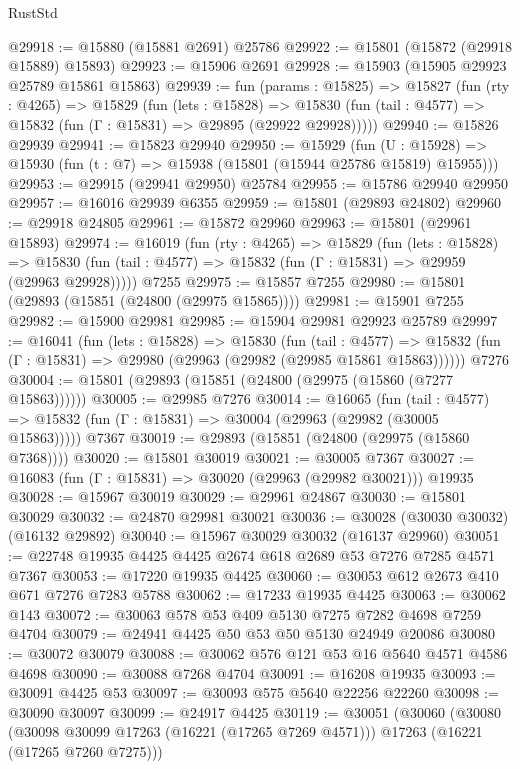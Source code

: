 \begin{lexlean}{RustStd}
\begin{coremodule}
@29918 := @15880 (@15881 @2691) @25786
@29922 := @15801 (@15872 (@29918 @15889) @15893)
@29923 := @15906 @2691
@29928 := @15903 (@15905 @29923 @25789 @15861 @15863)
@29939 := fun (params : @15825) =>
  @15827
    (fun (rty : @4265) =>
    @15829
      (fun (lets : @15828) =>
      @15830 (fun (tail : @4577) => @15832 (fun (Γ : @15831) => @29895 (@29922 @29928)))))
@29940 := @15826 @29939
@29941 := @15823 @29940
@29950 := @15929
    (fun (U : @15928) => @15930 (fun (t : @7) => @15938 (@15801 (@15944 @25786 @15819) @15955)))
@29953 := @29915 (@29941 @29950) @25784
@29955 := @15786 @29940 @29950
@29957 := @16016 @29939 @6355
@29959 := @15801 (@29893 @24802)
@29960 := @29918 @24805
@29961 := @15872 @29960
@29963 := @15801 (@29961 @15893)
@29974 := @16019
    (fun (rty : @4265) =>
    @15829
      (fun (lets : @15828) =>
      @15830 (fun (tail : @4577) => @15832 (fun (Γ : @15831) => @29959 (@29963 @29928)))))
    @7255
@29975 := @15857 @7255
@29980 := @15801 (@29893 (@15851 (@24800 (@29975 @15865))))
@29981 := @15901 @7255
@29982 := @15900 @29981
@29985 := @15904 @29981 @29923 @25789
@29997 := @16041
    (fun (lets : @15828) =>
    @15830
      (fun (tail : @4577) =>
      @15832 (fun (Γ : @15831) => @29980 (@29963 (@29982 (@29985 @15861 @15863))))))
    @7276
@30004 := @15801 (@29893 (@15851 (@24800 (@29975 (@15860 (@7277 @15863))))))
@30005 := @29985 @7276
@30014 := @16065
    (fun (tail : @4577) => @15832 (fun (Γ : @15831) => @30004 (@29963 (@29982 (@30005 @15863)))))
    @7367
@30019 := @29893 (@15851 (@24800 (@29975 (@15860 @7368))))
@30020 := @15801 @30019
@30021 := @30005 @7367
@30027 := @16083 (fun (Γ : @15831) => @30020 (@29963 (@29982 @30021))) @19935
@30028 := @15967 @30019
@30029 := @29961 @24867
@30030 := @15801 @30029
@30032 := @24870 @29981 @30021
@30036 := @30028 (@30030 @30032) (@16132 @29892)
@30040 := @15967 @30029 @30032 (@16137 @29960)
@30051 := @22748 @19935 @4425 @4425 @2674 @618 @2689 @53 @7276 @7285 @4571 @7367
@30053 := @17220 @19935 @4425
@30060 := @30053 @612 @2673 @410 @671 @7276 @7283 @5788
@30062 := @17233 @19935 @4425
@30063 := @30062 @143
@30072 := @30063 @578 @53 @409 @5130 @7275 @7282 @4698 @7259 @4704
@30079 := @24941 @4425 @50 @53 @50 @5130 @24949 @20086
@30080 := @30072 @30079
@30088 := @30062 @576 @121 @53 @16 @5640 @4571 @4586 @4698
@30090 := @30088 @7268 @4704
@30091 := @16208 @19935
@30093 := @30091 @4425 @53
@30097 := @30093 @575 @5640 @22256 @22260
@30098 := @30090 @30097
@30099 := @24917 @4425
@30119 := @30051
    (@30060
      (@30080
        (@30098 @30099 @17263 (@16221 (@17265 @7269 @4571)))
        @17263
        (@16221 (@17265 @7260 @7275)))

\end{coremodule}
\end{lexlean}
